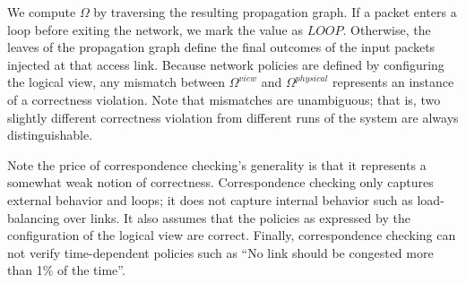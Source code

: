 We compute $\Omega$ by traversing the resulting propagation graph. If a packet
enters a loop before exiting the network, we mark the value as
$LOOP$. Otherwise,
the leaves of the propagation graph define the final outcomes of the input
packets injected at that access link. Because network policies are defined by
configuring the logical view, any mismatch between $\Omega^{view}$ and $\Omega^{physical}$
represents an instance of a correctness violation. Note that mismatches are
unambiguous; that is, two slightly different correctness violation from
different runs of the system are always distinguishable.

Note the price of correspondence checking's generality is that it represents
a somewhat weak notion of
correctness. Correspondence checking only captures external behavior and
loops; it does not capture internal behavior such as load-balancing
over links. It also assumes that the policies as expressed by the
configuration of the logical view are correct. Finally, correspondence
checking can not verify
time-dependent policies such as ``No link should be congested more than 1\% of
the time''.

